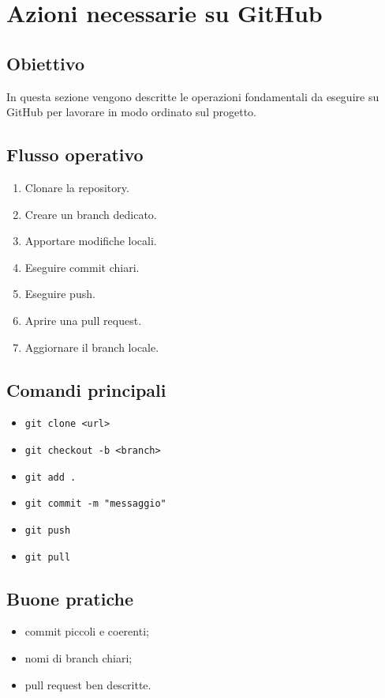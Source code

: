 \chapter{Azioni necessarie su GitHub}
\label{chap:github}

\section{Obiettivo}
In questa sezione vengono descritte le operazioni fondamentali da eseguire su GitHub per lavorare in modo ordinato sul progetto.

\section{Flusso operativo}
\begin{enumerate}
  \item Clonare la repository.
  \item Creare un branch dedicato.
  \item Apportare modifiche locali.
  \item Eseguire commit chiari.
  \item Eseguire push.
  \item Aprire una pull request.
  \item Aggiornare il branch locale.
\end{enumerate}

\section{Comandi principali}
\begin{itemize}
  \item \texttt{git clone <url>}
  \item \texttt{git checkout -b <branch>}
  \item \texttt{git add .}
  \item \texttt{git commit -m "messaggio"}
  \item \texttt{git push}
  \item \texttt{git pull}
\end{itemize}

\section{Buone pratiche}
\begin{itemize}
  \item commit piccoli e coerenti;
  \item nomi di branch chiari;
  \item pull request ben descritte.
\end{itemize}